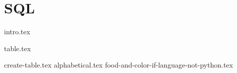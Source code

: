 \documentclass{exam}
\begin{document}
\section{SQL}
{intro.tex}
\newpage

\begin{questions}
  \question
  {table.tex}
  \begin{parts}
    {create-table.tex}
    {alphabetical.tex}
    {food-and-color-if-language-not-python.tex}
  \end{parts}
\end{questions}
\end{document}
